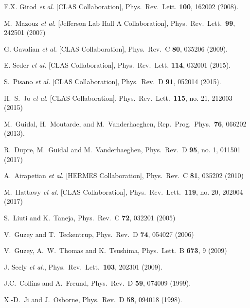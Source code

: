 \documentclass[twocolumn,nofootinbib,showpacs,prl,superscriptaddress,secnumarabic,amssymb,nobibnotes,aps,floatfix]{revtex4}
\begin{document}
\begin{thebibliography}{99}
F.X. Girod {\it et al.} [CLAS Collaboration],
Phys.\ Rev.\ Lett. {\bf 100}, 162002 (2008).

   M.~Mazouz {\it et al.} [Jefferson Lab Hall A Collaboration],
   Phys.\ Rev.\ Lett.\  {\bf 99}, 242501 (2007)

G. Gavalian {\it et al.} [CLAS Collaboration],
Phys.\ Rev.\ C {\bf 80}, 035206 (2009).

E. Seder {\it et al.} [CLAS Collaboration],
Phys.\ Rev.\ Lett. {\bf 114}, 032001 (2015).

S.~Pisano {\it et al.} [CLAS Collaboration],
Phys.\ Rev.\ D {\bf 91}, 052014 (2015).

 H.~S.~Jo {\it et al.} [CLAS Collaboration],
  Phys.\ Rev.\ Lett.\  {\bf 115}, no. 21, 212003 (2015)

 M.~Guidal, H.~Moutarde, and M.~Vanderhaeghen,
Rep.\ Prog.\ Phys.\  {\bf 76}, 066202 (2013).

 R.~Dupre, M.~Guidal and M.~Vanderhaeghen,
 Phys.\ Rev.\ D {\bf 95}, no. 1, 011501 (2017)

 A.~Airapetian {\it et al.} [HERMES Collaboration],
Phys.\ Rev.\ C {\bf 81}, 035202 (2010)

   M.~Hattawy {\it et al.} [CLAS Collaboration],
   Phys.\ Rev.\ Lett.\  {\bf 119}, no. 20, 202004 (2017)


S.~Liuti and K.~Taneja, Phys.\ Rev.\ C {\bf 72}, 032201 (2005)

 V.~Guzey and T.~Teckentrup, Phys.\ Rev.\ D {\bf 74}, 
   054027 (2006)

 V.~Guzey, A.~W.~Thomas and K.~Tsushima,
  Phys.\ Lett.\ B {\bf 673}, 9 (2009)

J. Seely {\it et al.}, Phys.\ Rev.\ Lett.\ {\bf 103}, 202301 (2009).


J.C.~Collins and A.~Freund, Phys.\ Rev.\ D {\bf 59}, 074009 (1999).

   X.-D.~Ji and J.~Osborne, Phys.\ Rev.\ D {\bf 58}, 094018 (1998).


\end{thebibliography}
\end{document}
